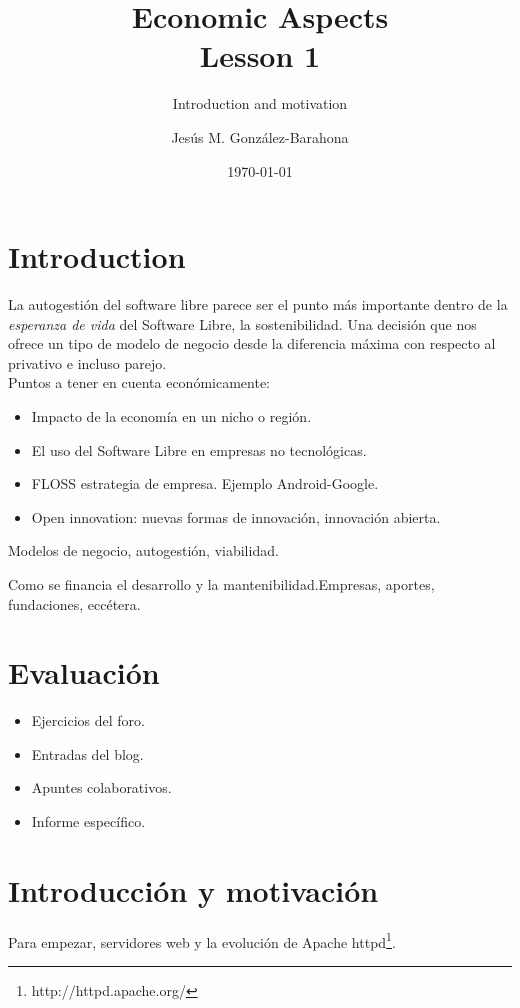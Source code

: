 \documentclass[11pt]{scrartcl}
\title{\textbf{Economic Aspects\\
                Lesson 1}}
\subtitle{Introduction and motivation}
\author{Jes\'us M. Gonz\'alez-Barahona}
\date{\today}
\begin{document}
\maketitle

\section{Introduction}

La autogestión del software libre parece ser el punto más importante dentro de la \emph{esperanza de vida} del Software Libre, la sostenibilidad.
Una decisión que nos ofrece un tipo de modelo de negocio desde la diferencia máxima con respecto al privativo e incluso parejo.\\

Puntos a tener en cuenta económicamente:
\begin{itemize}
    \item Impacto de la economía en un nicho o región.
    \item El uso del Software Libre en empresas no tecnológicas.
    \item FLOSS estrategia de empresa. Ejemplo Android-Google.
    \item Open innovation: nuevas formas de innovación, innovación abierta.
\end{itemize}

Modelos de negocio, autogestión, viabilidad.

Como se financia el desarrollo y la mantenibilidad.Empresas, aportes, fundaciones, eccétera.

\section{Evaluación}

\begin{itemize}
    \item Ejercicios del foro.
    \item Entradas del blog.
    \item Apuntes colaborativos.
    \item Informe específico.
\end{itemize}

\section{Introducción y motivación}

Para empezar, servidores web y la evolución de Apache httpd\footnote{http://httpd.apache.org/}.
\end{document}
